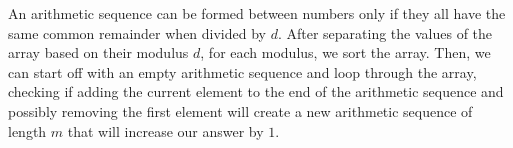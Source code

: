 An arithmetic sequence can be formed between numbers only if they all have the same common remainder when divided by $d$. After separating the values of the array based on their modulus $d$, for each modulus, we sort the array. Then, we can start off with an empty arithmetic sequence and loop through the array, checking if adding the current element to the end of the arithmetic sequence and possibly removing the first element will create a new arithmetic sequence of length $m$ that will increase our answer by $1$.
